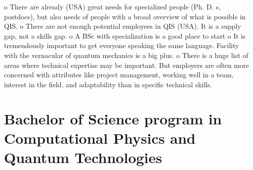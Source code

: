 \documentclass[oneside,final,10pt]{article}
\begin{document}
o There are already (USA) great needs for specialized people (Ph. D. s, postdocs), but also needs of  people with a broad overview of what is possible in QIS.
o There are not enough potential employees in QIS (USA). It is a supply gap, not a skills gap.
o A BSc with specialization  is a good place to start
o It is tremendously important to get everyone speaking the same language. Facility with the vernacular of quantum mechanics is a big plus.
o There is a huge list of areas where technical expertise may be important. But employers are often more concerned with attributes like project management, working well in a team, interest in the field, and adaptability than in specific technical skills.


\section*{Bachelor of Science program in Computational Physics and Quantum Technologies}
\end{document}

